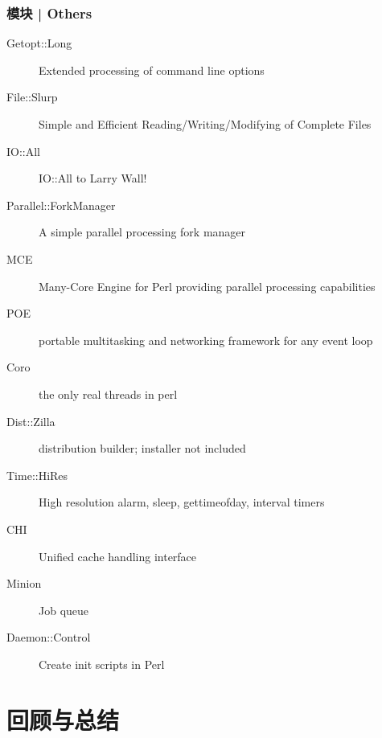 \begin{frame}
  \frametitle{模块 | Others}
    \begin{description}
      \item[Getopt::Long] Extended processing of command line options
      \item[File::Slurp] Simple and Efficient Reading/Writing/Modifying of Complete Files
      \item[IO::All] IO::All to Larry Wall!
      \item[Parallel::ForkManager] A simple parallel processing fork manager
      \item[MCE] Many-Core Engine for Perl providing parallel processing capabilities
      \item[POE] portable multitasking and networking framework for any event loop
      \item[Coro] the only real threads in perl
      \item[Dist::Zilla] distribution builder; installer not included
      \item[Time::HiRes] High resolution alarm, sleep, gettimeofday, interval timers
      \item[CHI] Unified cache handling interface
      \item[Minion] Job queue
      \item[Daemon::Control]Create init scripts in Perl
    \end{description}
\end{frame}

\section{回顾与总结}
